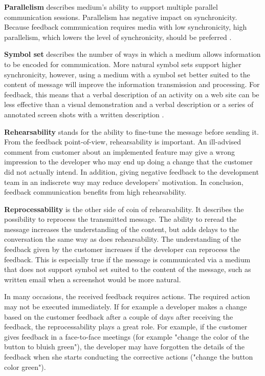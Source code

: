 \documentclass[english,12pt,a4paper,pdftex]{article}
\begin{document}
\textbf{Parallelism} describes medium's ability to support multiple parallel communication sessions. Parallelism has negative impact on synchronicity. Because feedback communication requires media with low synchronicity, high parallelism, which lowers the level of synchronicity, should be preferred \citep{dennis1999}.

\textbf{Symbol set} describes the number of ways in which a medium allows information to be encoded for communication. More natural symbol sets support higher synchronicity, however, using a medium with a symbol set better suited to the content of message will improve the information transmission and processing. For feedback, this means that a verbal description of an activity on a web site can be less effective than a visual demonstration and a verbal description or a series of annotated screen shots with a written description \citep{dennis1999}.

\textbf{Rehearsability} stands for the ability to fine-tune the message before sending it. From the feedback point-of-view, rehearsability is important. An ill-advised comment from customer about an implemented feature may give a wrong impression to the developer who may end up doing a change that the customer did not actually intend. In addition, giving negative feedback to the development team in an indiscrete way may reduce developers' motivation. In conclusion, feedback communication benefits from high rehearsability.

\textbf{Reprocessability} is the other side of coin of rehearsability. It describes the possibility to reprocess the transmitted message. The ability to reread the message increases the understanding of the content, but adds delays to the conversation the same way as does rehearsability. The understanding of the feedback given by the customer increases if the developer can reprocess the feedback. This is especially true if the message is communicated via a medium that does not support symbol set suited to the content of the message, such as written email when a screenshot would be more natural.

In many occasions, the received feedback requires actions. The required action may not be executed immediately. If for example a developer makes a change based on the customer feedback after a couple of days after receiving the feedback, the reprocessability plays a great role. For example, if the customer gives feedback in a face-to-face meetings (for example "change the color of the button to bluish green"), the developer may have forgotten the details of the feedback when she starts conducting the corrective actions ("change the button color green").
\end{document}
